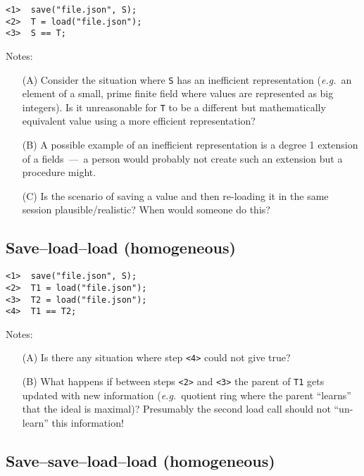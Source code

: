 \documentclass{article}
\newcommand \eg {\textit{e.g.}}
\begin{document}
\begin{verbatim}
<1>  save("file.json", S);
<2>  T = load("file.json");
<3>  S == T;
\end{verbatim}

Notes:
\begin{itemize}
  \item[(A)]  Consider the situation where \texttt{S} has an inefficient
     representation (\eg~an element of a small, prime finite
     field where values are represented as big integers).
     Is it unreasonable for \texttt{T} to be a different but mathematically
     equivalent value using a more efficient representation?

   \item[(B)] A possible example of an inefficient representation is a
     degree 1 extension of a fields~---~a person would probably not create
     such an extension but a procedure might.

   \item[(C)]  Is the scenario of saving a value and then re-loading it
     in the same session plausible/realistic?  When would someone do this?
\end{itemize}


\subsection{Save--load--load (homogeneous)}

\begin{verbatim}
<1>  save("file.json", S);
<2>  T1 = load("file.json");
<3>  T2 = load("file.json");
<4>  T1 == T2;
\end{verbatim}

Notes:
\begin{itemize}
\item[(A)]  Is there any situation where step \verb|<4>| could not give true?

  \item[(B)]  What happens if between steps \verb|<2>| and \verb|<3>| the parent of \verb|T1|
     gets updated with new information (\eg~quotient ring where
     the parent ``learns'' that the ideal is maximal)?  Presumably
     the second load call should not ``un-learn'' this information!
\end{itemize}



\subsection{Save--save--load--load (homogeneous)}
\end{document}
